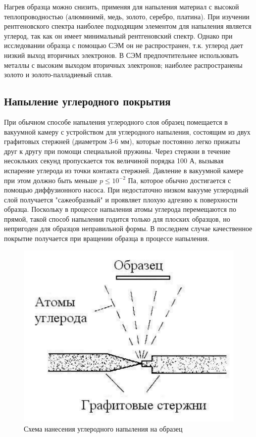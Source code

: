 \documentclass[12pt]{article}
\begin{document}
Нагрев образца можно снизить, применяя для напыления материал с высокой теплопроводностью (алюминимй, медь, золото, серебро, платина). При изучении рентгеновского спектра наиболее подходящим элементом для напыления является углерод, так как он имеет минимальный рентгеновский спектр. Однако при исследовании образца с помощью СЭМ он не распространен, т.к. углерод дает низкий выход вторичных электронов. В СЭМ предпочтительнее использовать металлы с высоким выходом вторичных электронов; наиболее распространены золото и золото-палладиевый сплав.  

\subsection*{Напыление углеродного покрытия}

При обычном способе напыления углеродного слоя образец помещается в вакуумной камеру с устройством для углеродного напыления, состоящим из двух графитовых стержней (диаметром 3-6 мм), которые постоянно легко прижаты друг к другу при помощи специальной пружины. Через стержни в течение несокльких секунд пропускается ток величиной порядка 100 А, вызывая испарение углерода из точки контакта стержней. Давление в вакуумной камере при этом должно быть меньше $p \leq 10^{-2}$ Па, которое обычно достигается с помощью диффузионного насоса. При недостаточно низком вакууме углеродный слой получается "сажеобразный" и проявляет плохую адгезию к поверхности образца. Поскольку в процессе напыления атомы углерода перемещаются по прямой, такой способ напыления годится только для плоских образцов, но непригоден для образцов неправильной формы. В последнем случае качественное покрытие получается при вращении образца в процессе напыления. 

\begin{figure}[!ht]
\centering
\includegraphics[scale = 0.5]{pictures/graphite.png}
\caption{Схема нанесения углеродного напыления на образец}
\label{tungsten-cathode}
\end{figure}
\end{document}
